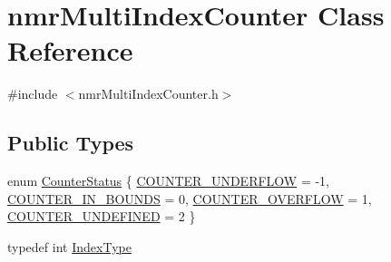 \hypertarget{classnmr_multi_index_counter}{\section{nmr\-Multi\-Index\-Counter Class Reference}
\label{classnmr_multi_index_counter}
}


{\ttfamily \#include $<$nmr\-Multi\-Index\-Counter.\-h$>$}

\subsection*{Public Types}
\begin{DoxyCompactItemize}
\item 
enum \hyperlink{classnmr_multi_index_counter_ad7beda3a3ee347140b4b5540770aeba5}{Counter\-Status} \{ \hyperlink{classnmr_multi_index_counter_ad7beda3a3ee347140b4b5540770aeba5a7ef7728fe4f2d2360228d3f73d17aa34}{C\-O\-U\-N\-T\-E\-R\-\_\-\-U\-N\-D\-E\-R\-F\-L\-O\-W} = -\/1, 
\hyperlink{classnmr_multi_index_counter_ad7beda3a3ee347140b4b5540770aeba5a606ccb8b13969ab6d6867038d58b5974}{C\-O\-U\-N\-T\-E\-R\-\_\-\-I\-N\-\_\-\-B\-O\-U\-N\-D\-S} = 0, 
\hyperlink{classnmr_multi_index_counter_ad7beda3a3ee347140b4b5540770aeba5a8c8a5600eadc951f5289ee1220138047}{C\-O\-U\-N\-T\-E\-R\-\_\-\-O\-V\-E\-R\-F\-L\-O\-W} = 1, 
\hyperlink{classnmr_multi_index_counter_ad7beda3a3ee347140b4b5540770aeba5a2bf5f16725f84bef901340f84c7b5262}{C\-O\-U\-N\-T\-E\-R\-\_\-\-U\-N\-D\-E\-F\-I\-N\-E\-D} = 2
 \}
\item 
typedef int \hyperlink{classnmr_multi_index_counter_a0632b941a7d18df347174b4345d73d01}{Index\-Type}
\end{DoxyCompactItemize}
